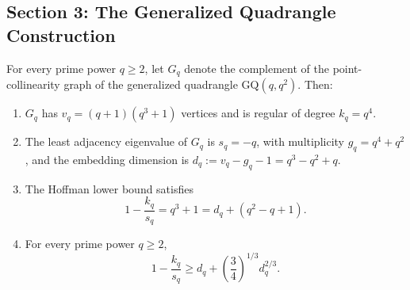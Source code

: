 \subsection*{Section 3: The Generalized Quadrangle Construction}

\begin{theorem}
\label{thm:gq-family}
For every prime power $q\ge 2$, let $G_q$ denote the complement of the point-collinearity graph of the generalized quadrangle $\mathrm{GQ}(q,q^2)$. Then:
\begin{enumerate}
  \item $G_q$ has $v_q=(q+1)(q^3+1)$ vertices and is regular of degree $k_q=q^4$.
  \item The least adjacency eigenvalue of $G_q$ is $s_q=-q$, with multiplicity $g_q=q^4+q^2$, and the embedding dimension is $d_q:=v_q-g_q-1=q^3-q^2+q$.
  \item The Hoffman lower bound satisfies
    \[1-\frac{k_q}{s_q}=q^3+1=d_q+(q^2-q+1).\]
  \item For every prime power $q\ge 2$,
    \[1-\frac{k_q}{s_q}\ge d_q+\left(\frac{3}{4}\right)^{1/3}d_q^{2/3}.\]
\end{enumerate}
\end{theorem}

